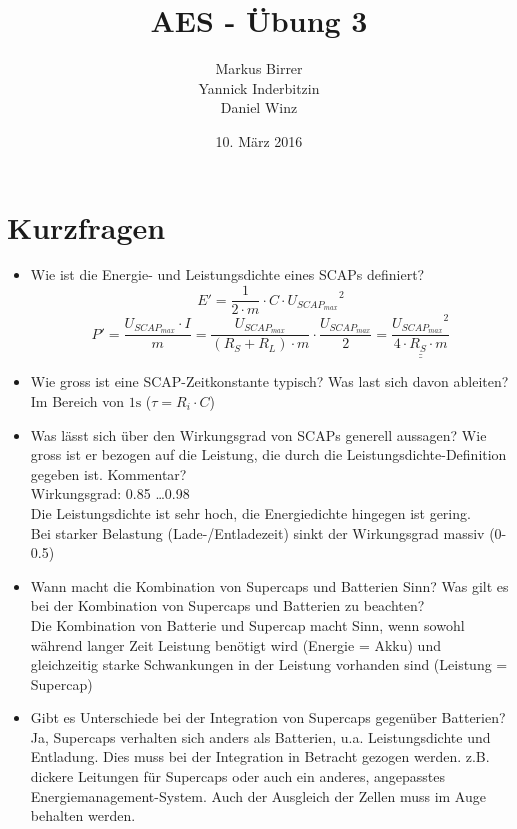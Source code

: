 \documentclass[a4,paper,fleqn]{article}
\title{AES - Übung 3}
\date{10. März 2016}
\author{Markus Birrer \\
        Yannick Inderbitzin\\
        Daniel Winz}
\newcommand{\uuline}[1]{{\underline{\underline{#1}}}}
\begin{document}
\maketitle
\vfill
\tableofcontents
\vfill
\clearpage

\section{Kurzfragen}
\begin{itemize}
\item Wie ist die Energie- und Leistungsdichte eines SCAPs definiert? \\
    \[ E' = \frac{1}{2 \cdot m} \cdot C \cdot {U_{SCAP_{max}}}^{2} \]
    \[ P' = \frac{U_{SCAP_{max}} \cdot I}{m} 
    = \frac{U_{SCAP{_{max}}}}{\left(R_{S} + R_{L}\right) \cdot m} 
    \cdot \frac{U_{SCAP_{max}}}{2} 
    = \uuline{\frac{{U_{SCAP_{max}}}^{2}}{4 \cdot R_{S} \cdot m}} \]
\item Wie gross ist eine SCAP-Zeitkonstante typisch? Was last sich davon 
ableiten? \\
    Im Bereich von $1\si{\second}$ ($\tau = R_{i} \cdot C$)
\item Was lässt sich über den Wirkungsgrad von SCAPs generell aussagen? Wie 
gross ist er bezogen auf die Leistung, die durch die 
Leistungsdichte-Definition gegeben ist. Kommentar? \\
    Wirkungsgrad: 0.85 \ldots 0.98 \\
    Die Leistungsdichte ist sehr hoch, die Energiedichte hingegen ist gering. \\
    Bei starker Belastung (Lade-/Entladezeit) sinkt der Wirkungsgrad massiv 
    (0-0.5) \\
\item Wann macht die Kombination von Supercaps und Batterien Sinn? Was gilt es 
bei der Kombination von Supercaps und Batterien zu beachten? \\
    Die Kombination von Batterie und Supercap macht Sinn, wenn sowohl während 
    langer Zeit Leistung benötigt wird (Energie = Akku) und gleichzeitig 
    starke Schwankungen in der Leistung vorhanden sind (Leistung = Supercap)
\item Gibt es Unterschiede bei der Integration von Supercaps gegenüber 
Batterien? \\
    Ja, Supercaps verhalten sich anders als Batterien, u.a. Leistungsdichte 
    und Entladung. Dies muss bei der Integration in Betracht gezogen werden. 
    z.B. dickere Leitungen für Supercaps oder auch ein anderes, angepasstes 
    Energiemanagement-System. Auch der Ausgleich der Zellen muss im Auge 
    behalten werden.
\end{itemize}
\end{document}
